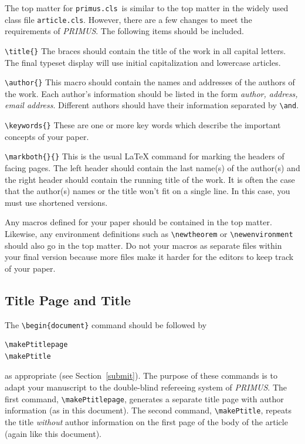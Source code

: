 \documentclass{primus}
\newcommand{\pcls}{{\tt primus.cls}}
\newcommand{\PR}{{\it PRIMUS}}
\begin{document}
The top matter for \pcls\ is similar to the top
matter in the widely used class file {\tt article.cls}. However, there are a few changes
to meet the requirements of \PR. The following items should
be included.
\begin{description}
\item\verb|\title{}|\quad
The braces should contain the title of the work in all capital letters. The final typeset display will use initial capitalization and lowercase articles.  
\item\verb|\author{}|\quad
This macro should contain the names and addresses of the authors of the
work. Each author's information should be listed in the form {\em author,
address, email address}. Different authors should have their information
separated by \verb|\and|.
\item\verb|\keywords{}|\quad
These are one or more key words which describe the important concepts of
your paper.
\item\verb|\markboth{}{}|\quad
This is the usual \LaTeX{} command for marking the headers of facing pages.
The left header should contain the last name(s) of the author(s) and the right
header should contain the running title of the work. It is often the case that the
author(s) names or the title won't fit on a single line. In this case, you
must use shortened versions.
\end{description}

Any macros defined for your paper should be contained in the top matter.
Likewise, any environment definitions such as \verb|\newtheorem| or
\verb|\newenvironment| should also go in the top matter. Do not
\verb|| your macros as separate files within your final version
because more files make it harder for the editors to keep track of
your paper. 



\subsection{Title Page and Title}\label{TitlePage}

The \verb|\begin{document}| command should be followed by

\begin{verbatim}
\makePtitlepage
\makePtitle
\end{verbatim}
\noindent as appropriate (see Section~\ref{submit}).
The purpose of these commands is to adapt your manuscript to the double-blind refereeing system of \PR. The first command, \verb|\makePtitlepage|, generates a separate title page with author information (as in this document). The second command, \verb|\makePtitle|, repeats the title {\it without} author information on the first page of the body of the article (again like this document). 
\end{document}
